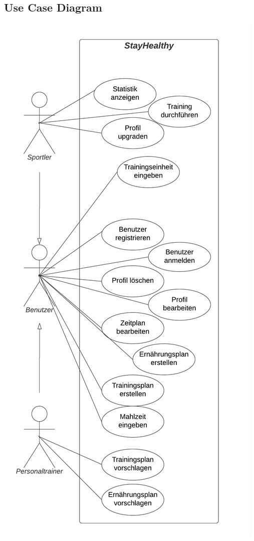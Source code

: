 \documentclass[12pt,a4paper,onecolumn]{article}
\begin{document}
\subsection{Use Case Diagram}
\includegraphics[scale=0.8]{Anwendungsfalldiagramm.png}
\end{document}
